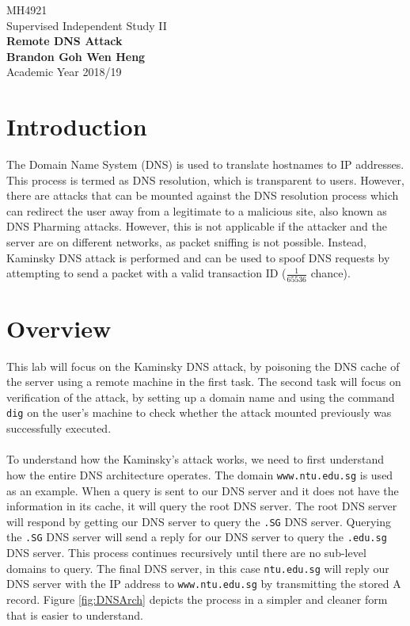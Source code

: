 \documentclass[a4paper,12pt]{article}
\begin{document}
	\begin{titlepage}
		\begin{center}
			\vspace*{9em}
			\Huge 
			MH4921\\ Supervised Independent Study II\\
			\vspace*{4em}
			\LARGE
			\textbf{Remote DNS Attack}\\		
			\vspace{4em}
			\textbf{Brandon Goh Wen Heng}\\
			\vspace*{4em}
			Academic Year 2018/19
			\vfill
		\end{center}
	\end{titlepage}
	
	\tableofcontents
	\newpage
	\section{Introduction}
	The Domain Name System (DNS) is used to translate hostnames to IP addresses. This process is termed as DNS resolution, which is transparent to users. However, there are attacks that can be mounted against the DNS resolution process which can redirect the user away from a legitimate to a malicious site, also known as DNS Pharming attacks. However, this is not applicable if the attacker and the server are on different networks, as packet sniffing is not possible. Instead, Kaminsky DNS attack is performed and can be used to spoof DNS requests by attempting to send a packet with a valid transaction ID ($\frac{1}{65536}$ chance).
\section{Overview}
This lab will focus on the Kaminsky DNS attack, by poisoning the DNS cache of the server using a remote machine in the first task. The second task will focus on verification of the attack, by setting up a domain name and using the command \texttt{dig} on the user's machine to check whether the attack mounted previously was successfully executed.\\\\To understand how the Kaminsky's attack works, we need to first understand how the entire DNS architecture operates. The domain \texttt{www.ntu.edu.sg} is used as an example. When a query is sent to our DNS server and it does not have the information in its cache, it will query the root DNS server. The root DNS server will respond by getting our DNS server to query the \texttt{.SG} DNS server. Querying the \texttt{.SG} DNS server will send a reply for our DNS server to query the \texttt{.edu.sg} DNS server. This process continues recursively until there are no sub-level domains to query. The final DNS server, in this case \texttt{ntu.edu.sg} will reply our DNS server with the IP address to \texttt{www.ntu.edu.sg} by transmitting the stored A record. Figure \ref{fig:DNSArch} depicts the process in a simpler and cleaner form that is easier to understand.
\end{document}

